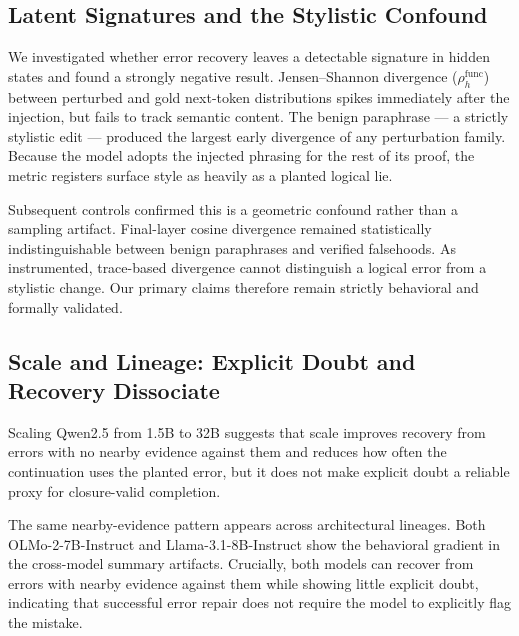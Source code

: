 \documentclass{article}
\begin{document}
\subsection{Latent Signatures and the Stylistic Confound}
We investigated whether error recovery leaves a detectable signature in hidden states
and found a strongly negative result. Jensen--Shannon divergence
($\rho_{h}^{\mathrm{func}}$) between perturbed and gold next-token distributions spikes
immediately after the injection, but fails to track semantic content. The benign
paraphrase --- a strictly stylistic edit --- produced the largest early divergence of
any perturbation family. Because the model adopts the injected phrasing for the rest
of its proof, the metric registers surface style as heavily as a planted logical lie.

Subsequent controls confirmed this is a geometric confound rather than a sampling
artifact. Final-layer cosine divergence remained statistically indistinguishable
between benign paraphrases and verified falsehoods. As instrumented, trace-based
divergence cannot distinguish a logical error from a stylistic change. Our primary
claims therefore remain strictly behavioral and formally validated.

\subsection{Scale and Lineage: Explicit Doubt and Recovery Dissociate}
Scaling Qwen2.5 from 1.5B to 32B suggests that scale improves recovery from
errors with no nearby evidence against them and reduces how often the continuation
uses the planted error, but it does not make explicit doubt a reliable proxy for
closure-valid completion.

\begin{table}[h]
\centering\small
\PaperTableScaleLineage
\caption{Scale sweep over Qwen2.5 models. Ranges are over early, middle, and late
injection positions and are regenerated from summary artifacts. The Qwen2.5-7B row
uses the expanded primary artifact, making it numerically comparable to
Table~\ref{tab:main}; the other size rows use the matched cross-model summary
artifacts.}
\label{tab:scale}
\end{table}
The same nearby-evidence pattern appears across architectural lineages. Both
OLMo-2-7B-Instruct and Llama-3.1-8B-Instruct show the behavioral gradient in the
cross-model summary artifacts. Crucially, both models can recover from errors with
nearby evidence against them while showing little explicit doubt, indicating that
successful error repair does not require the model to explicitly flag the mistake.
\end{document}
